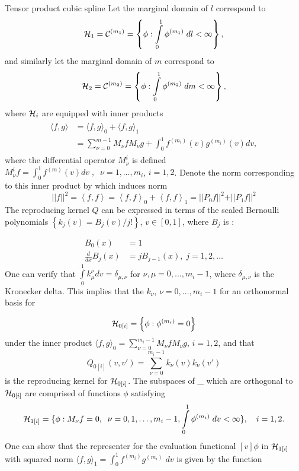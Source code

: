 \begin{example}{Tensor product cubic spline}
\vspace{0.5cm}
Let the marginal domain of $l$ correspond to 
\[
\mathcal{H}_1 = \mathcal{C}^{\left(m_1\right)} = \left\{ \phi: \int \limits_{0}^1 \phi^{\left(m_1\right)}\;dl < \infty  \right\},
\]
\noindent
and similarly let the marginal domain of $m$ correspond to 
\[
\mathcal{H}_2 = \mathcal{C}^{\left(m_2\right)} = \left\{ \phi: \int \limits_{0}^1 \phi^{\left(m_2\right)}\;dm < \infty  \right\},
\]
\noindent
where $\mathcal{H}_i$ are equipped with inner products
\begin{align}
\begin{split}
\langle f,g\rangle &= \langle f,g\rangle_0 + \langle f,g\rangle_1\\
 &= \sum_{\nu=0}^{m-1}M_{\nu} f M_{\nu} g + \int_0^1 f^{\left( m_i \right)}\left(v\right)g^{\left( m_i \right)}\left(v\right)dv,
\end{split}
\end{align}
\noindent
where the differential operator $M^i_\nu$ is defined $M^i_\nu f = \int_0^1 f^{\left( m \right)}\left(v\right) dv\;,\;\; \nu = 1, \dots, m_i$, $i = 1,2$. Denote the norm corresponding to this inner product by
which induces norm 
\[
\vert \vert f \vert \vert^2 = \left< f,f\right> = \left< f,f\right>_0 + \left< f,f\right>_1 = \vert \vert P_0 f \vert \vert^2 + \vert \vert P_1 f \vert \vert^2
\]
\noindent
The reproducing kernel $Q$ can be expressed in terms of the scaled Bernoulli polynomials $\left\{ k_j\left(v\right) = B_j\left(v\right)/{j!} \right\}$, $v \in \left[0,1\right]$, where $B_j$ is :

\begin{align*}
B_0\left(x\right) &= 1\\
\frac{d}{dx} B_j\left(x\right) &= jB_{j-1}\left(x\right), \;j = 1, 2, \dots
\end{align*}
\noindent
One can verify that $\int \limits_0^1 k_\mu^\nu dv = \delta_{\mu,\nu}$ for $\nu, \mu= 0,\dots, m_i -1$, where $\delta_{\mu,\nu}$ is the Kronecker delta. This implies that the $k_\nu$, $\nu = 0,\dots, m_i-1$ for an orthonormal basis for 

\[
\mathcal{H}_{0\left[i\right]} = \left\{ \phi: \phi^{\left( m_i \right)} = 0 \right\}
\]
\noindent
under the inner product $\langle f,g\rangle_0 =  \sum_{\nu=0}^{m_i-1}M_{\nu} f M_{\nu} g$, $i = 1, 2$, and that 
\[
Q_{0\left[i\right]}\left(v,v'\right) = \sum_{\nu=0}^{m_i-1}  k_\nu\left(v\right)  k_\nu\left(v'\right) 
\]
\noindent
is the reproducing kernel for $\mathcal{H}_{0\left[i\right]}$. The subspaces of \hilbert_{\left[i\right]} which are orthogonal to $\mathcal{H}_{0\left[i\right]}$ are comprised of functions $\phi$ satisfying 
\[
\mathcal{H}_{1\left[i\right]} = \lbrace \phi: M_\nu f = 0,\;\; \nu = 0,1,\dots, m_i-1,\int\limits_{0}^1 \phi^{\left(m_i\right)}\;dv < \infty \rbrace, \quad i = 1,2.
\]
One can show that the representer for the evaluation functional $\left[v\right] \phi$ in $\mathcal{H}_{1\left[i\right]}$ with squared norm $\langle f,g\rangle_1= \int_0^1 f^{\left(m_i\right)}g^{\left(m_i\right)}\;dv$ is given by the function


\end{example}
